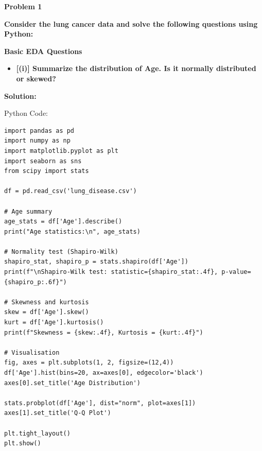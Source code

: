 \documentclass[12pt]{article}
\begin{document}
{\Large \textbf{Problem 1}}

\vspace{0.4cm}

\textbf{Consider the lung cancer data and solve the following questions using Python:}

\vspace{0.5cm}

{\large \textbf{Basic EDA Questions}}

\vspace{0.3cm}

\begin{itemize}
    \item\textbf{[(i)] Summarize the distribution of \textbf{Age}. Is it normally
    distributed or skewed?}
\end{itemize}

{\large\textbf{Solution:}}

\vspace{0.1cm}

{\large{Python Code:}}

\vspace{0.2cm}

\begin{minipage}{0.92\textwidth}
\begin{verbatim}
import pandas as pd
import numpy as np
import matplotlib.pyplot as plt
import seaborn as sns
from scipy import stats

df = pd.read_csv('lung_disease.csv')

# Age summary
age_stats = df['Age'].describe()
print("Age statistics:\n", age_stats)

# Normality test (Shapiro-Wilk)
shapiro_stat, shapiro_p = stats.shapiro(df['Age'])
print(f"\nShapiro-Wilk test: statistic={shapiro_stat:.4f}, p-value={shapiro_p:.6f}")

# Skewness and kurtosis
skew = df['Age'].skew()
kurt = df['Age'].kurtosis()
print(f"Skewness = {skew:.4f}, Kurtosis = {kurt:.4f}")

# Visualisation
fig, axes = plt.subplots(1, 2, figsize=(12,4))
df['Age'].hist(bins=20, ax=axes[0], edgecolor='black')
axes[0].set_title('Age Distribution')

stats.probplot(df['Age'], dist="norm", plot=axes[1])
axes[1].set_title('Q-Q Plot')

plt.tight_layout()
plt.show()

\end{verbatim}
\end{minipage}\\
\end{document}
